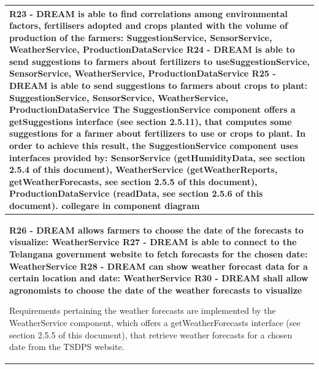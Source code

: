 \documentclass{article}
\begin{document}
\begin{longtable}[c]{|m{11.75cm}|}
    \textbf{R23 - DREAM is able to find correlations among environmental factors, fertilisers adopted and crops planted with the volume of production of the farmers: SuggestionService, SensorService, WeatherService, ProductionDataService
    \newline\newline
    R24 - DREAM is able to send suggestions to farmers about fertilizers to useSuggestionService, SensorService, WeatherService, ProductionDataService
    \newline\newline
    R25 - DREAM is able to send suggestions to farmers about crops to plant: SuggestionService, SensorService, WeatherService, ProductionDataService
    \newline\newline}
    The SuggestionService component offers a getSuggestions interface (see section 2.5.11), that computes some suggestions for a farmer about fertilizers to use or crops to plant. In order to achieve this result, the SuggestionService component uses interfaces provided by: SensorService (getHumidityData, see section 2.5.4 of this document), WeatherService (getWeatherReports, getWeatherForecasts, see section 2.5.5 of this document), ProductionDataService (readData, see section 2.5.6 of this document).
    \color{red}
    collegare in component diagram
    \color{black}\\
    \hline
    
    \textbf{R26 - DREAM allows farmers to choose the date of the forecasts to visualize: WeatherService
    \newline\newline
    R27 - DREAM is able to connect to the Telangana government website to fetch forecasts for the chosen date: WeatherService
    \newline\newline
    R28 - DREAM can show weather forecast data for a certain location and date: WeatherService
    \newline\newline
    R30 - DREAM shall allow agronomists to choose the date of the weather forecasts to visualize}
    \newline\newline
    
    Requirements pertaining the weather forecasts are implemented by the WeatherService component, which offers a getWeatherForecasts interface (see section 2.5.5 of this document), that retrieve weather forecasts for a chosen date from the TSDPS website.\\
    \hline
    

\end{longtable}
\end{document}
